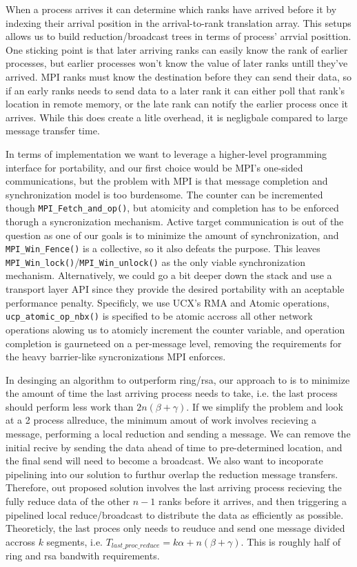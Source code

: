 When a process arrives it can determine which ranks have arrived before it by indexing their arrival position in the arrival-to-rank translation array.
This setups allows us to build reduction/broadcast trees in terms of process' arrvial posittion.
One sticking point is that later arriving ranks can easily know the rank of earlier processes, but earlier processes won't know the value of later ranks untill they've arrived.
MPI ranks must know the destination before they can send their data, so if an early ranks needs to send data to a later rank it can either poll that rank's location in remote memory, or the late rank can notify the earlier process once it arrives.
While this does create a litle overhead, it is negligbale compared to large message transfer time.

In terms of implementation we want to leverage a higher-level programming interface for portability, and our first choice would be MPI's one-sided communications, but the problem with MPI is that message completion and synchronization model is too burdensome. 
The counter can be incremented though \texttt{MPI\_Fetch\_and\_op()}, but atomicity and completion has to be enforced thorugh a syncronization mechanism. 
Active target communication is out of the question as one of our goals is to minimize the amount of synchronization, and \texttt{MPI\_Win\_Fence()} is a collective, so it also defeats the purpose.
This leaves \texttt{MPI\_Win\_lock()}/\texttt{MPI\_Win\_unlock()} as the only viable synchronization mechanism.
Alternatively, we could go a bit deeper down the stack and use a transport layer API since they provide the desired portability with an aceptable performance penalty.
Specificly, we use UCX's RMA and Atomic operations, \texttt{ucp\_atomic\_op\_nbx()} is specified to be atomic accross all other network operations alowing us to atomicly increment the counter variable, and operation completion is gaurneteed on a per-message level, removing the requirements for the heavy barrier-like syncronizations MPI enforces.

In desinging an algorithm to outperform ring/rsa, our approach to is to minimize the amount of time the last arriving process needs to take, i.e. the last process should perform less work than $2n(\beta+\gamma)$. 
If we simplify the problem and look at a 2 process allreduce, the minimum amout of work involves recieving a message, performing a local reduction and sending a message.
We can remove the initial recive by sending the data ahead of time to pre-determined location, and the final send will need to become a broadcast. 
We also want to incoporate pipelining into our solution to furthur overlap the reduction message transfers.
Therefore, out proposed solution involves the last arriving process recieving the fully reduce data of the other $n-1$ ranks before it arrives, and then triggering a pipelined local reduce/broadcast to distribute the data as efficiently as possible. 
Theoreticly, the last proces only needs to reuduce and send one message divided accross $k$ segments, i.e. $T_{last\_proc\_reduce}=k\alpha+n(\beta+\gamma)$.
This is roughly half of ring and rsa bandwith requirements.

